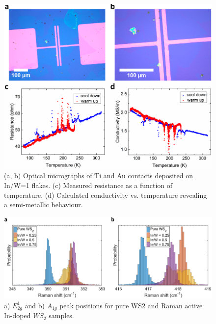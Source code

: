 \begin{figure}[!h]
	\begin{center}
		\includegraphics[scale=0.5]{In/ElectricalMeasurements.png}
		\caption{(a, b) Optical micrographs of Ti and Au contacts deposited on In/W=1 flakes. (c) Measured resistance as a function of temperature. (d) Calculated conductivity vs. temperature revealing a semi-metallic behaviour.}
		\label{fig:InElectricalMeasurement}
	\end{center}
\end{figure}

\begin{figure}[!h]
	\begin{center}
		\includegraphics[scale=0.5]{In/RamanPositionHistogram.png}
		\caption{a) $E^1_{2g}$ and b) $A_{1g}$ peak positions for pure WS2 and Raman active In-doped $WS_2$ samples.}
		\label{fig:InRamanPLHistogram}
	\end{center}
\end{figure}

